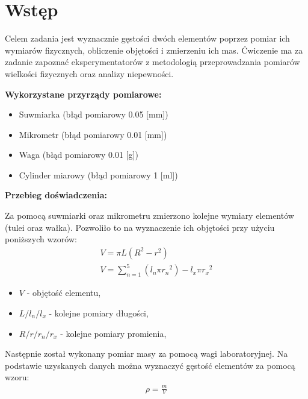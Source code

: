 \documentclass[11pt]{article}
\begin{document}
    \section{Wstęp}
    \par{
        Celem zadania jest wyznacznie gęstości dwóch elementów poprzez pomiar ich wymiarów fizycznych, obliczenie objętości i zmierzeniu ich mas.
        Ćwiczenie ma za zadanie zapoznać eksperymentatorów z metodologią przeprowadzania pomiarów wielkości fizycznych oraz analizy niepewności.
    }
    \vspace{3mm}
    \par{\noindent \textbf{Wykorzystane przyrządy pomiarowe:}}
    \begin{itemize}[topsep=0pt]
        \itemsep0em
        \item Suwmiarka (błąd pomiarowy 0.05 [mm])
        \item Mikrometr (błąd pomiarowy 0.01 [mm])
        \item Waga (błąd pomiarowy 0.01 [g])
        \item Cylinder miarowy (błąd pomiarowy 1 [ml])
    \end{itemize}
    \vspace{3mm}
    \par{\noindent \textbf{Przebieg doświadczenia:}}
    \par{\noindent
    Za pomocą suwmiarki oraz mikrometru zmierzono kolejne wymiary elementów (tulei oraz wałka).
    Pozwoliło to na wyznaczenie ich objętości przy użyciu poniższych wzorów:
    }
    \begin{gather*}
        V = \pi L(R^2 -r^2)\\
        V =  \sum_{n=1}^{5}(l_n\pi {r_{n}}^2)-l_x\pi {r_{x}}^2
    \end{gather*}
    {
        \footnotesize
        \begin{itemize}
            \setlength\itemsep{0.1em}
            \item[] $V$ - objętość elementu,
            \item[] $L/l_n/l_x$ - kolejne pomiary długości,
            \item[] $R/r/r_n/r_x$ - kolejne pomiary promienia,
        \end{itemize}
    }
    \par{\noindent
        Następnie został wykonany pomiar masy za pomocą wagi laboratoryjnej. 
        Na podstawie uzyskanych danych można wyznaczyć gęstość elementów za pomocą wzoru:
    }
    \begin{gather*}
        \rho=\frac{m}{V}
    \end{gather*}
\end{document}
